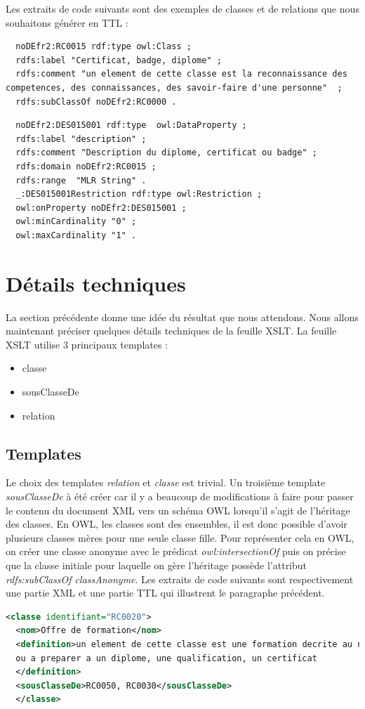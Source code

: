 \documentclass[11pt]{report}
\begin{document}
\hfill \break
Les extraits de code suivants sont des exemples de classes et de relations que nous souhaitons générer en TTL : 
\begin{lstlisting}
  noDEfr2:RC0015 rdf:type owl:Class ;
  rdfs:label "Certificat, badge, diplome" ;
  rdfs:comment "un element de cette classe est la reconnaissance des competences, des connaissances, des savoir-faire d'une personne"  ;
  rdfs:subClassOf noDEfr2:RC0000 .
\end{lstlisting}

\begin{lstlisting}
  noDEfr2:DES015001 rdf:type  owl:DataProperty ;
  rdfs:label "description" ;
  rdfs:comment "Description du diplome, certificat ou badge" ;
  rdfs:domain noDEfr2:RC0015 ;
  rdfs:range  "MLR String" .
  _:DES015001Restriction rdf:type owl:Restriction ;
  owl:onProperty noDEfr2:DES015001 ;
  owl:minCardinality "0" ;
  owl:maxCardinality "1" .
\end{lstlisting}
\newpage
\section{Détails techniques}

La section précédente donne une idée du résultat que nous attendons. Nous allons maintenant préciser quelques détails techniques de la feuille XSLT.
\hfill \break
La feuille XSLT utilise 3 principaux templates :
\begin{itemize}
\item classe
\item sousClasseDe
\item relation
\end{itemize}
\hfill \break

\subsection{Templates}

Le choix des templates \emph{relation} et \emph{classe} est trivial. Un troisième template \emph{sousClasseDe} à été créer car il y a beaucoup de modifications à faire pour passer le contenu du document XML vers un schéma OWL lorsqu'il s'agit de l'héritage des classes. En OWL, les classes sont des ensembles, il est donc possible d'avoir plusieurs classes mères pour une seule classe fille. Pour représenter cela en OWL, on créer une classe anonyme avec le prédicat \emph{owl:intersectionOf} puis on précise que la classe initiale pour laquelle on gère l'héritage possède l'attribut \emph{rdfs:subClassOf classAnonyme}.
\hfill \break
\hfill \break
Les extraits de code suivants sont respectivement une partie XML et une partie TTL qui illustrent le paragraphe précédent.
\begin{lstlisting}[language=XML]
  <classe identifiant="RC0020">
  <nom>Offre de formation</nom>
  <definition>un element de cette classe est une formation decrite au niveau national, cette formation pouvant donner lieu a une attestation
  ou a preparer a un diplome, une qualification, un certificat
  </definition>
  <sousClasseDe>RC0050, RC0030</sousClasseDe>
  </classe>
\end{lstlisting}
\end{document}
